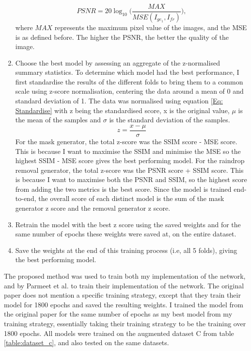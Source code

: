 \documentclass[11pt]{ociamthesis}  %
\begin{document}
\begin{enumerate}
    \begin{equation}
        PSNR = 20 \log_{10}\Bigr(\frac{MAX}{MSE(I_{ge_{1}},I_{fr})}\Bigr),
        \label{Eq:PSNR}
    \end{equation}
    where $MAX$ represents the maximum pixel value of the images, and the MSE is as defined before. The higher the PSNR, the better the quality of the image.
    \item Choose the best model by assessing an aggregate of the z-normalised summary statistics.
    To determine which model had the best performance, I first standardise the results of the different folds to bring them to a common scale using z-score normalisation, centering the data around a mean of 0 and standard deviation of 1. The data was normalised using equation \ref{Eq: Standardise} with z being the standardised score, x is the original value, $\mu$ is the mean of the samples and $\sigma$ is the standard deviation of the samples.
    \begin{equation}
        z = \frac{x - \mu}{\sigma}
        \label{Eq: Standardise}
    \end{equation}
    For the mask generator, the total z-score was the SSIM score - MSE score. This is because I want to maximise the SSIM and minimise the MSE so the highest SSIM - MSE score gives the best performing model. For the raindrop removal generator, the total z-score was the PSNR score + SSIM score. This is because I want to maximise both the PSNR and SSIM, so the highest score from adding the two metrics is the best score. Since the model is trained end-to-end, the overall score of each distinct model is the sum of the mask generator z score and the removal generator z score.
    \item Retrain the model with the best z score using the saved weights and for the same number of epochs these weights were saved at, on the entire dataset. 
    \item Save the weights at the end of this training process (i.e, all 5 folds), giving the best performing model.
\end{enumerate}

The proposed method was used to train both my implementation of the network, and by Parmeet et al.\cite{Parmeet_Report} to train their implementation of the network. The original paper does not mention a specific training strategy, except that they train their model for 1800 epochs and saved the resulting weights. I trained the model from the original paper for the same number of epochs as my best model from my training strategy, essentially taking their training strategy to be the training over 1800 epochs. All models were trained on the augmented dataset C from table \ref{table:dataset_c}, and also tested on the same datasets. 
\end{document}
